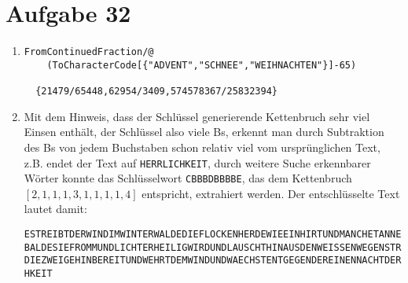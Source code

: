 \section*{Aufgabe 32}
\begin{enumerate}
	\item
	\lstset{language=Mathematica}
	\begin{lstlisting}
FromContinuedFraction/@
	(ToCharacterCode[{"ADVENT","SCHNEE","WEIHNACHTEN"}]-65)

  {21479/65448,62954/3409,574578367/25832394}
	\end{lstlisting}
	\item Mit dem Hinweis, dass der Schlüssel generierende Kettenbruch sehr
	viel Einsen enthält, der Schlüssel also viele Bs, erkennt man durch Subtraktion des
	Bs von jedem Buchstaben schon relativ viel vom ursprünglichen Text,
	z.B. endet der Text auf \verb/HERRLICHKEIT/, durch weitere Suche
	erkennbarer Wörter konnte das Schlüsselwort \verb/CBBBDBBBBE/, das dem
	Kettenbruch $[2,1,1,1,3,1,1,1,1,4]$ entspricht, extrahiert werden. Der
	entschlüsselte Text lautet damit:

\begin{verbatim}
ESTREIBTDERWINDIMWINTERWALDEDIEFLOCKENHERDEWIEEINHIRTUNDMANCHETANNEAHNTWIE
BALDESIEFROMMUNDLICHTERHEILIGWIRDUNDLAUSCHTHINAUSDENWEISSENWEGENSTRECKTSIE
DIEZWEIGEHINBEREITUNDWEHRTDEMWINDUNDWAECHSTENTGEGENDEREINENNACHTDERHERRLIC
HKEIT
\end{verbatim}
\end{enumerate}


